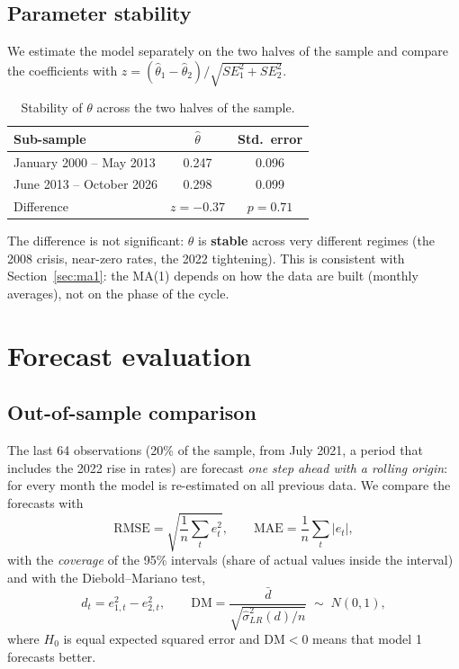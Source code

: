 \documentclass[11pt,a4paper]{article}
\begin{document}
\subsection{Parameter stability}

We estimate the model separately on the two halves of the sample and compare the coefficients with $z = (\hat\theta_1 - \hat\theta_2)/\sqrt{SE_1^2 + SE_2^2}$.

\begin{table}[H]
\centering
\begin{tabular}{lcc}
\toprule
Sub-sample & $\hat\theta$ & Std.\ error \\
\midrule
January 2000 -- May 2013 & 0.247 & 0.096 \\
June 2013 -- October 2026 & 0.298 & 0.099 \\
\midrule
Difference & $z = -0.37$ & $p = 0.71$ \\
\bottomrule
\end{tabular}
\caption{Stability of $\theta$ across the two halves of the sample.}
\end{table}

The difference is not significant: $\theta$ is \textbf{stable} across very different regimes (the 2008 crisis, near-zero rates, the 2022 tightening). This is consistent with Section~\ref{sec:ma1}: the MA(1) depends on how the data are built (monthly averages), not on the phase of the cycle.

\section{Forecast evaluation}

\subsection{Out-of-sample comparison}\label{sec:oos}

The last 64 observations (20\% of the sample, from July 2021, a period that includes the 2022 rise in rates) are forecast \emph{one step ahead with a rolling origin}: for every month the model is re-estimated on all previous data. We compare the forecasts with
\begin{equation}
\mathrm{RMSE} = \sqrt{\frac{1}{n}\sum_t e_t^2}, \qquad \mathrm{MAE} = \frac{1}{n}\sum_t |e_t|,
\end{equation}
with the \emph{coverage} of the 95\% intervals (share of actual values inside the interval) and with the Diebold--Mariano test,
\begin{equation}
d_t = e_{1,t}^2 - e_{2,t}^2, \qquad \mathrm{DM} = \frac{\bar d}{\sqrt{\hat\sigma^2_{LR}(d)/n}} \;\sim\; N(0,1),
\end{equation}
where $H_0$ is equal expected squared error and $\mathrm{DM} < 0$ means that model 1 forecasts better.
\end{document}
